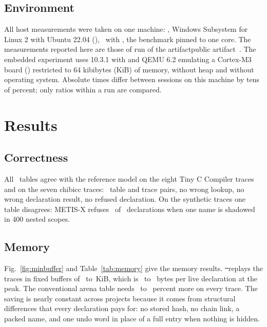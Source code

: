 \subsection{Environment}
All host measurements were taken on one machine: \EnvCPU, Windows Subsystem for Linux 2 with Ubuntu 22.04 (\EnvKernel), \EnvCompiler\ with , the benchmark pinned to one core. The measurements reported here are those of run \code{\RunName} of the \ifdefined\anonymous artifact\else public artifact~\cite{strata}\fi. The embedded experiment uses  10.3.1 with  and QEMU 6.2 emulating a Cortex-M3 board () restricted to 64 kibibytes (KiB) of memory, without heap and without operating system. Absolute times differ between sessions on this machine by tens of percent; only ratios within a run are compared.

\section{Results}
\label{sec:results}

\subsection{Correctness}
All \NTables\ tables agree with the reference model on the eight Tiny C Compiler traces and on the seven chibicc traces: \NPairsAll\ table and trace pairs, no wrong lookup, no wrong declaration result, no refused declaration. On the synthetic traces one table disagrees: METIS-X refuses \MetisRefused\ of \MetisRefusedOf\ declarations when one name is shadowed in 400 nested scopes.

\subsection{Memory}

Fig.~\ref{fig:minbuffer} and Table~\ref{tab:memory} give the memory results. \st\ replays the traces in fixed buffers of \MinBufLo\ to \MinBufHi\,KiB, which is \BytesLo\ to \BytesHi\ bytes per live declaration at the peak. The conventional arena table needs \SaveLo\ to \SaveHi\ percent more on every trace. The saving is nearly constant across projects because it comes from structural differences that every declaration pays for: no stored hash, no chain link, a packed name, and one undo word in place of a full entry when nothing is hidden.

